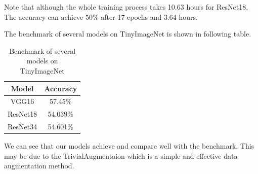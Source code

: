 \documentclass{ctexart}
\begin{document}
Note that although the whole training process takes 10.63 hours for ResNet18, 
The accuracy can achieve 50\% after 17 epochs and 3.64 hours.

The benchmark of several models on TinyImageNet is shown in following table.

\begin{table}[H]
    \centering
    \begin{tabular}{|c|c|}
        \hline
        Model & Accuracy \\
        \hline
        VGG16 & 57.45\%\\
        \hline
        ResNet18 & 54.039\%\\
        \hline
        ResNet34 & 54.601\%\\
        \hline
    \end{tabular}
    \caption{Benchmark of several models on TinyImageNet}
    \label{tab:benchmark_tinyimagenet}
\end{table}

We can see that our models achieve and compare well with the benchmark. This may be due to the TrivialAugmentaion
which is a simple and effective data augmentation method.
\end{document}
